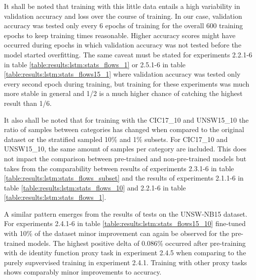 

It shall be noted that training with this little data entails a high variability in validation accuracy and loss over the course of training. In our case, validation accuracy was tested only every 6 epochs of training for the overall 600 training epochs to keep training times reasonable. Higher accuracy scores might have occurred during
epochs in which validation accuracy was not tested before the model started overfitting. The same caveat must be stated for experiments 2.2.1-6 in table \ref{table:results:lstm:stats_flows_1} or 2.5.1-6 in table \ref{table:results:lstm:stats_flows15_1} where validation accuracy was tested only every second epoch during training, but training for these experiments was much more stable in general and 1/2 is a much higher chance of catching the highest result than 1/6. \par 



It also shall be noted that for training with the CIC17\_10 and UNSW15\_10 the ratio of samples between categories has changed when compared to the original dataset or the stratified sampled 10\% and 1\% subsets. For CIC17\_10 and UNSW15\_10, the same amount of samples per category are included. This does not impact the comparison between pre-trained and non-pre-trained models but takes from the comparability between results of experiments 2.3.1-6 in table \ref{table:results:lstm:stats_flows_subset} and the results of experiments 2.1.1-6 in table \ref{table:results:lstm:stats_flows_10} and 2.2.1-6 in table \ref{table:results:lstm:stats_flows_1}. \par
A similar pattern emerges from the results of tests on the UNSW-NB15 dataset. For experiments 2.4.1-6 in table \ref{table:results:lstm:stats_flows15_10} fine-tuned with 10\% of the dataset minor improvement can again be observed for the pre-trained models. The highest positive delta of 0.086\% occurred after pre-training with de identity function proxy task in experiment 2.4.5 when comparing to the purely supvervised training in experiment 2.4.1. Training with other proxy tasks shows comparably minor improvements to accuracy. \par





